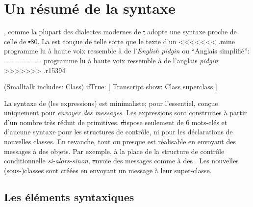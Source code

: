 \documentclass[a4paper,10pt,twoside]{book}
\begin{document}
	\renewcommand{\nnbb}[2]{} %
	\sloppy
\fi
\chapter{Un r\'esum\'e de la syntaxe}
\label{cha:syntax}



\sq, comme la plupart des dialectes modernes de \st, adopte une syntaxe proche de celle de \st-80.
La  est con\c{c}ue de telle sorte que le texte d'un
<<<<<<< .mine
programme lu \`{a} haute voix ressemble \`{a} de l'\emph{English pidgin} ou ``Anglais simplifié'':
=======
programme lu \`{a} haute voix ressemble \`{a} de l'anglais
  \emph{pidgin}:
>>>>>>> .r15394

\begin{code}{}
(Smalltalk includes: Class) ifTrue: [ Transcript show: Class superclass ]
\end{code}

\noindent
La syntaxe de \sq (\ie les expressions) est minimaliste; pour l'essentiel, con\c{c}ue uniquement pour \emph{envoyer des messages}.
Les expressions sont construites \`{a} partir d'un nombre tr\`{e}s r\'{e}duit de primitives.
\st dispose seulement de 6 mots-cl\'{e}s et d'aucune syntaxe pour les structures de contr\^{o}le, ni pour les d\'{e}clarations de nouvelles classes.
En revanche, tout ou presque est r\'{e}alisable en envoyant des messages \`{a} des objets.
Par exemple, \`{a} la place de la structure de contr\^{o}le conditionnelle \emph{si-alors-sinon}, \st envoie des messages comme  \`{a} des .
Les nouvelles \mbox{(sous-)classes} sont cr\'{e}\'{e}es en envoyant un message \`{a} leur super-classe.

\section{Les \'{e}l\'{e}ments syntaxiques }
\end{document}
